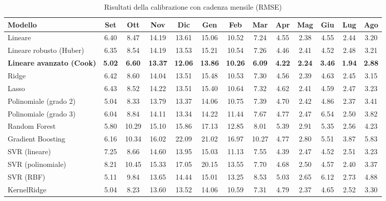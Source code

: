 \begin{table}[H]
    \tiny
    \centering
    \setlength{\tabcolsep}{4pt}
    \def\arraystretch{1.5}
    \begin{tabular}{|l|c|c|c|c|c|c|c|c|c|c|c|c|}
    \hline
        \textbf{Modello} & \textbf{Set} & \textbf{Ott} & \textbf{Nov} & \textbf{Dic} & \textbf{Gen} & \textbf{Feb} & \textbf{Mar} & \textbf{Apr} & \textbf{Mag} & \textbf{Giu} & \textbf{Lug} & \textbf{Ago} \\ \hline
        Lineare & 6.40 & 8.47 & 14.19 & 13.61 & 15.06 & 10.52 & 7.24 & 4.55 & 2.38 & 4.55 & 2.44 & 3.20 \\ \hline
        Lineare robusto (Huber) & 6.35 & 8.54 & 14.19 & 13.53 & 15.21 & 10.54 & 7.26 & 4.46 & 2.41 & 4.52 & 2.48 & 3.21 \\ \hline
        \textbf{Lineare avanzato (Cook)} & \textbf{5.02} & \textbf{6.60} & \textbf{13.37} & \textbf{12.06} & \textbf{13.86} & \textbf{10.26} & \textbf{6.09} & \textbf{4.22} & \textbf{2.24} & \textbf{3.46} & \textbf{1.94} & \textbf{2.88} \\ \hline
        Ridge & 6.42 & 8.60 & 14.04 & 13.51 & 15.48 & 10.53 & 7.30 & 4.56 & 2.39 & 4.63 & 2.45 & 3.15 \\ \hline
        Lasso & 6.43 & 8.52 & 14.22 & 13.51 & 15.40 & 10.64 & 7.32 & 4.62 & 2.41 & 4.59 & 2.47 & 3.23 \\ \hline
        Polinomiale (grado 2) & 5.04 & 8.33 & 13.79 & 13.37 & 14.06 & 10.75 & 7.39 & 4.70 & 2.42 & 4.86 & 2.37 & 3.41 \\ \hline
        Polinomiale (grado 3) & 6.04 & 8.84 & 14.11 & 13.34 & 14.22 & 11.44 & 7.67 & 4.77 & 2.47 & 6.54 & 2.50 & 3.82 \\ \hline
        Random Forest & 5.80 & 10.29 & 15.10 & 15.86 & 17.13 & 12.85 & 8.01 & 5.39 & 2.91 & 5.35 & 2.56 & 4.23 \\ \hline
        Gradient Boosting & 6.16 & 10.34 & 16.02 & 22.09 & 21.02 & 16.97 & 10.27 & 4.77 & 2.80 & 5.51 & 3.87 & 5.83 \\ \hline
        SVR (lineare) & 7.25 & 8.66 & 14.60 & 13.95 & 15.03 & 11.13 & 7.55 & 4.39 & 2.47 & 4.52 & 2.51 & 3.23 \\ \hline
        SVR (polinomiale) & 8.21 & 10.45 & 15.33 & 17.05 & 20.15 & 13.55 & 7.70 & 4.68 & 2.50 & 4.57 & 2.40 & 3.37 \\ \hline
        SVR (RBF) & 5.11 & 9.84 & 13.65 & 14.44 & 15.01 & 13.25 & 8.53 & 5.03 & 2.65 & 6.12 & 2.73 & 4.88 \\ \hline
        KernelRidge & 5.04 & 8.23 & 13.60 & 13.52 & 14.06 & 10.59 & 7.31 & 4.79 & 2.37 & 4.65 & 2.52 & 3.30 \\ \hline
    \end{tabular}
    \captionsetup{justification=centering}
    \caption{Risultati della calibrazione  con cadenza mensile (RMSE)}
    \label{fig:risultati-pm10-rmse-mese}
\end{table}

